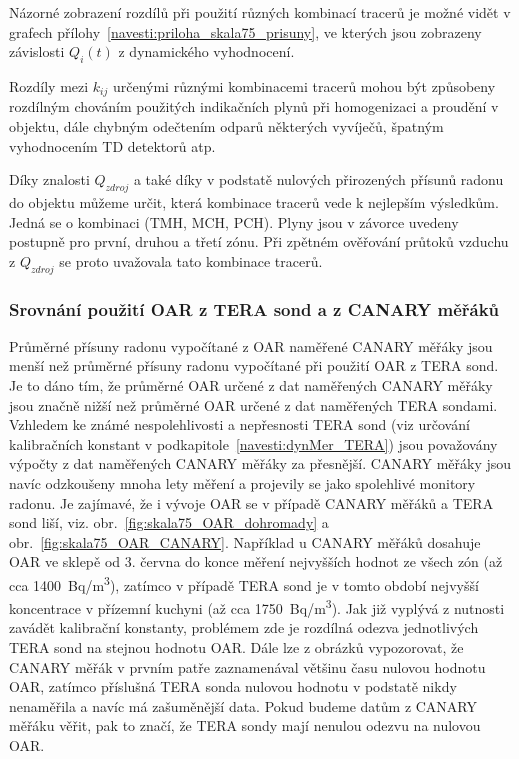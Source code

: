 Názorné zobrazení rozdílů při použití různých kombinací tracerů je možné vidět v grafech přílohy~\ref{navesti:priloha_skala75_prisuny}, ve kterých jsou zobrazeny závislosti $Q_i(t)$ z dynamického vyhodnocení.

Rozdíly mezi $k_{ij}$ určenými různými kombinacemi tracerů mohou být způsobeny rozdílným chováním použitých indikačních plynů při homogenizaci a proudění v objektu, dále chybným odečtením odparů některých vyvíječů, špatným vyhodnocením TD detektorů atp.

Díky znalosti $Q_{zdroj}$ a také díky v podstatě nulových přirozených přísunů radonu do objektu můžeme určit, která kombinace tracerů vede k nejlepším výsledkům. Jedná se o kombinaci (TMH, MCH, PCH). Plyny jsou v závorce uvedeny postupně pro první, druhou a třetí zónu. Při zpětném ověřování průtoků vzduchu z $Q_{zdroj}$ se proto uvažovala tato kombinace tracerů.

\subsubsection{Srovnání použití OAR z TERA sond a z CANARY měřáků}
Průměrné přísuny radonu vypočítané z OAR naměřené CANARY měřáky jsou menší než průměrné přísuny radonu vypočítané při použití OAR z TERA sond. Je to dáno tím, že průměrné OAR určené z dat naměřených CANARY měřáky jsou značně nižší než průměrné OAR určené z dat naměřených TERA sondami. Vzhledem ke známé nespolehlivosti a nepřesnosti TERA sond (viz určování kalibračních konstant v podkapitole~\ref{navesti:dynMer_TERA}) jsou považovány výpočty z dat naměřených CANARY měřáky za přesnější. CANARY měřáky jsou navíc odzkoušeny mnoha lety měření a projevily se jako spolehlivé monitory radonu. Je zajímavé, že i vývoje OAR se v případě CANARY měřáků a TERA sond liší, viz. obr.~\ref{fig:skala75_OAR_dohromady} a obr.~\ref{fig:skala75_OAR_CANARY}. Například u CANARY měřáků dosahuje OAR ve sklepě od 3. června do konce měření nejvyšších hodnot ze všech zón (až cca \SI{1400}{Bq/m^3}), zatímco v případě TERA sond je v
tomto období nejvyšší koncentrace v přízemní kuchyni (až cca \SI{1750}{Bq/m^3}). Jak již vyplývá z nutnosti zavádět kalibrační konstanty, problémem zde je rozdílná odezva jednotlivých TERA sond na stejnou hodnotu OAR. Dále lze z obrázků vypozorovat, že CANARY měřák v prvním patře zaznamenával většinu času nulovou hodnotu OAR, zatímco příslušná TERA sonda nulovou hodnotu v podstatě nikdy nenaměřila a navíc má zašuměnější data. Pokud budeme datům z CANARY měřáku věřit, pak to značí, že TERA sondy mají nenulou odezvu na nulovou OAR. 

